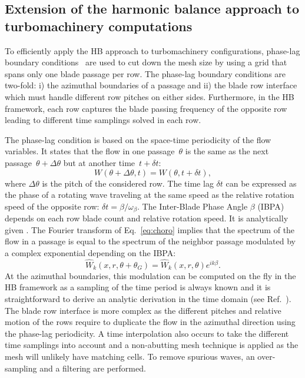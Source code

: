 

\subsection{Extension of the harmonic balance approach to
  turbomachinery computations}
\label{sec:turbomachinery_adaptation}

To efficiently apply the HB approach to turbomachinery
configurations, phase-lag boundary conditions~\cite{Erdos1977} are
used to cut down the mesh size by using a grid that spans only one
blade passage per row. The phase-lag boundary conditions are two-fold:
i) the azimuthal boundaries of a passage and ii) the blade row
interface which must handle different row pitches on either
sides. Furthermore, in the HB framework, each row captures the blade
passing frequency of the opposite row leading to different time
samplings solved in each row.

The phase-lag condition is based on the space-time periodicity of the
flow variables. It states that the flow in one passage~$\theta$ is the
same as the next passage~$\theta+\Delta\theta$ but at another
time~$t+\delta t$:
\begin{equation}
  W\left(\theta+\Delta\theta,t \right) = W\left(\theta,t+\delta t \right),
  \label{eq:choro}
\end{equation}
where $\Delta \theta$ is the pitch of the considered row.  The time
lag $\delta t$ can be expressed as the phase of a rotating wave
traveling at the same speed as the relative rotation speed of the
opposite row: $\delta t=\beta/\omega_\beta$.  The Inter-Blade Phase
Angle $\beta$ (IBPA) depends on each row blade count and relative
rotation speed. It is analytically given \citet{Gerolymos1991}.  The Fourier
transform of Eq.~\eqref{eq:choro} implies that the spectrum of the
flow in a passage is equal to the spectrum of the neighbor passage
modulated by a complex exponential depending on the IBPA:
\begin{equation*}
  \widehat{W}_k(x, r,  \theta+\theta_G)  = {\widehat{W}_k(x, r,
    \theta)e^{i k\beta}}.
\end{equation*}
At the azimuthal boundaries, this modulation can be computed on the fly
in the HB framework as a sampling of the time period is always known
and it is straightforward to derive an analytic derivation in the time
domain (see Ref.~\cite{JSicot2012}). The blade row interface is more complex
as the different pitches and relative motion of the rows require to
duplicate the flow in the azimuthal direction using the phase-lag
periodicity. A time interpolation also occurs to take the
different time samplings into account and a non-abutting mesh
technique is applied as the mesh will unlikely have matching
cells. To remove spurious waves, an over-sampling and a filtering are
performed. 

